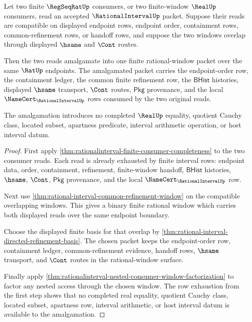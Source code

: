 \begin{theorem}
\label{thm:rationalinterval-window-overlap-consumer-amalgamation}
Let two finite $\RegSeqRatUp$ consumers, or two finite-window $\RealUp$
consumers, read an accepted $\RationalIntervalUp$ packet. Suppose their reads
are compatible on displayed endpoint rows, endpoint order, containment rows,
common-refinement rows, or handoff rows, and suppose the two windows overlap
through displayed $\hsame$ and $\Cont$ routes.

Then the two reads amalgamate into one finite rational-window packet over the
same $\RatUp$ endpoints. The amalgamated packet carries the endpoint-order row,
the containment ledger, the common finite refinement row, the
$\mathsf{BHist}$ histories, displayed $\hsame$ transport, $\Cont$ routes,
$\mathsf{Pkg}$ provenance, and the local $\NameCert_{\RationalIntervalUp}$
rows consumed by the two original reads.

The amalgamation introduces no completed $\RealUp$ equality, quotient Cauchy
class, located subset, apartness predicate, interval arithmetic operation, or
host interval datum.
\end{theorem}
\begin{proof}
First apply \autoref{thm:rationalinterval-finite-consumer-completeness} to the
two consumer reads. Each read is already exhausted by finite interval rows:
endpoint data, order, containment, refinement, finite-window handoff,
$\mathsf{BHist}$ histories, $\hsame$, $\Cont$, $\mathsf{Pkg}$ provenance, and
the local $\NameCert_{\RationalIntervalUp}$ row.

Next use \autoref{thm:rational-interval-common-refinement-window} on the
compatible overlapping windows. This gives a binary finite rational window
which carries both displayed reads over the same endpoint boundary.

Choose the displayed finite basis for that overlap by
\autoref{thm:rational-interval-directed-refinement-basis}. The chosen packet
keeps the endpoint-order row, containment ledger, common-refinement evidence,
handoff rows, $\hsame$ transport, and $\Cont$ routes in the rational-window
surface.

Finally apply
\autoref{thm:rationalinterval-nested-consumer-window-factorization} to factor
any nested access through the chosen window. The row exhaustion from the first
step shows that no completed real equality, quotient Cauchy class, located
subset, apartness row, interval arithmetic, or host interval datum is available
to the amalgamation.
\end{proof}

